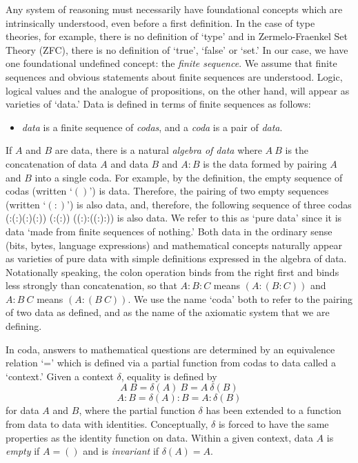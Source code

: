 \documentclass[11pt]{article}
\begin{document}
     Any system of reasoning must necessarily have foundational concepts which are intrinsically understood, even before a first definition.
In the case of type theories\cite{Type,Type2,HOTT,aldor}, for example, there is no definition of `type' and in Zermelo-Fraenkel Set Theory\cite{ZFC} (ZFC), there is no definition of `true', `false' or `set.'
In our case, we have one foundational undefined concept:
the {\it finite sequence}.  We assume that finite sequences and obvious statements about finite sequences are understood.  
Logic, logical values and the analogue of propositions, on the other hand, will appear as varieties of `data.'  Data is defined in terms of finite sequences as follows:
\begin{itemize}
\item {\it data} is a finite sequence of {\it codas}, and a {\it coda} is a pair of {\it data}.
\end{itemize}
If $A$ and $B$ are data, there is a natural {\it algebra of data} where $A\ B$ is the concatenation of data $A$ and data $B$ and $A:B$ is
the data formed by pairing $A$ and $B$ into a single coda.  For example, by the definition, the empty sequence of codas (written `$()$') is data.  Therefore,
the pairing of two empty sequences (written `$(:)$') is also data, and, therefore, the following sequence of three codas (:(:)(:)(:)) (:(:)) ((:):((:):)) is also data.
We refer to this as `pure data' since it is data `made from finite sequences of nothing.'
Both data in the ordinary sense (bits, bytes, language expressions) and mathematical concepts naturally appear as varieties
of pure data with simple definitions expressed in the algebra of data.  Notationally speaking, the colon operation binds from the right first and binds
less strongly than concatenation, so that $A:B:C$ means $(A:(B:C))$ and $A:B\ C$ means $(A:(B\ C))$.  We use the name `coda' both to refer 
to the pairing of two data as defined, and as the name of the axiomatic system that we are defining\cite{github}.

     In coda, answers to mathematical questions are determined by an equivalence relation `=' which is defined via a partial function from codas to data
called a `context.'  Given a context $\delta$, equality is defined by
\begin{equation}
	A\ B = \delta(A)\ B = A\ \delta(B)
\end{equation}
\begin{equation}
	A:B = \delta(A):B = A:\delta(B)
\end{equation}
for data $A$ and $B$, where the partial function $\delta$ has been extended to a function from data to data with identities.
Conceptually, $\delta$ is forced to have the same properties as the identity function on data.  Within a given context,
data $A$ is {\it empty} if $A=()$ and is {\it invariant} if $\delta(A)=A$.
\end{document}

